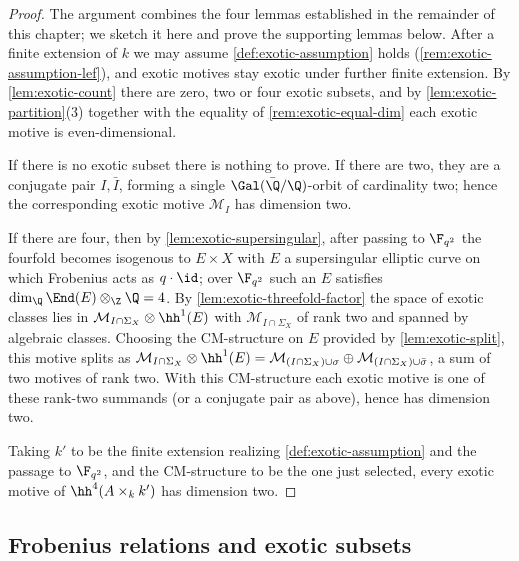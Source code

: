 \begin{proof}
  The argument combines the four lemmas established in the remainder of this
  chapter; we sketch it here and prove the supporting lemmas below.
  After a finite extension of \(k\) we may assume \cref{def:exotic-assumption}
  holds (\cref{rem:exotic-assumption-lef}), and exotic motives stay exotic under
  further finite extension. By \cref{lem:exotic-count} there are zero, two or
  four exotic subsets, and by \cref{lem:exotic-partition}(3) together with the
  equality of \cref{rem:exotic-equal-dim} each exotic motive is even-dimensional.

  If there is no exotic subset there is nothing to prove. If there are two, they
  are a conjugate pair \(I, \bar I\), forming a single \(\Gal(\bar\Q/\Q)\)-orbit
  of cardinality two; hence the corresponding exotic motive \(\mathcal{M}_I\) has
  dimension two.

  If there are four, then by \cref{lem:exotic-supersingular}, after passing to
  \(\F_{q^2}\) the fourfold becomes isogenous to \(E \times X\) with \(E\) a
  supersingular elliptic curve on which Frobenius acts as \(q \cdot \id\); over
  \(\F_{q^2}\) such an \(E\) satisfies \(\dim_\Q \End(E) \otimes_\Z \Q = 4\). By
  \cref{lem:exotic-threefold-factor} the space of exotic classes lies in
  \(\mathcal{M}_{I \cap \Sigma_X} \otimes \hh^1(E)\) with
  \(\mathcal{M}_{I \cap \Sigma_X}\) of rank two and spanned by algebraic classes.
  Choosing the CM-structure on \(E\) provided by \cref{lem:exotic-split}, this
  motive splits as
  \(\mathcal{M}_{I \cap \Sigma_X} \otimes \hh^1(E) =
    \mathcal{M}_{(I \cap \Sigma_X) \cup \sigma} \oplus
    \mathcal{M}_{(I \cap \Sigma_X) \cup \bar\sigma}\),
  a sum of two motives of rank two. With this CM-structure each exotic motive is
  one of these rank-two summands (or a conjugate pair as above), hence has
  dimension two.

  Taking \(k'\) to be the finite extension realizing \cref{def:exotic-assumption}
  and the passage to \(\F_{q^2}\), and the CM-structure to be the one just
  selected, every exotic motive of \(\hh^{4}(A \times_k k')\) has dimension two.
\end{proof}

\subsection*{Frobenius relations and exotic subsets}

